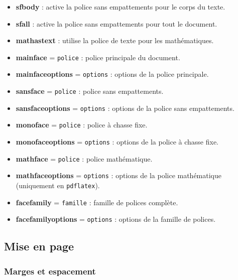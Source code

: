 \documentclass[
    french,
    margin=2cm
]{neoschool}
\begin{document}
\begin{itemize}
\item \textbf{sfbody} : active la police sans empattements pour le corps du
  texte.
\item \textbf{sfall} : active la police sans empattements pour tout le
  document.
\item \textbf{mathastext} : utilise la police de texte pour les
  mathématiques.
\item \textbf{mainface} = \texttt{police} : police
  principale du document.
\item \textbf{mainfaceoptions} = \texttt{options} : options
  de la police principale.
\item \textbf{sansface} = \texttt{police} : police sans
  empattements.
\item \textbf{sansfaceoptions} = \texttt{options} : options
  de la police sans empattements.
\item \textbf{monoface} = \texttt{police} : police à chasse
  fixe.
\item \textbf{monofaceoptions} = \texttt{options} : options
  de la police à chasse fixe.
\item \textbf{mathface} = \texttt{police} : police
  mathématique.
\item \textbf{mathfaceoptions} = \texttt{options} : options
  de la police mathématique (uniquement en \texttt{pdflatex}).
\item \textbf{facefamily} = \texttt{famille} : famille de
  polices complète.
\item \textbf{facefamilyoptions} = \texttt{options} :
  options de la famille de polices.
\end{itemize}

\subsection{Mise en page}

\subsubsection{Marges et espacement}
\end{document}
